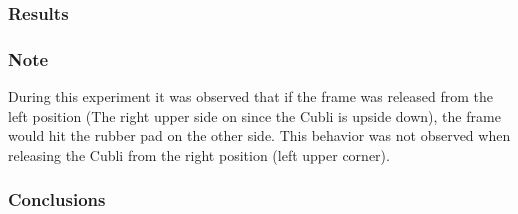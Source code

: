 \subsubsection{Results}

\subsubsection{Note}
During this experiment it was observed that if the frame was released from the left position (The right upper side on  since the Cubli is upside down), the frame would hit the rubber pad on the other side. This behavior was not observed when releasing the Cubli from the right position (left upper corner).

\subsubsection{Conclusions}